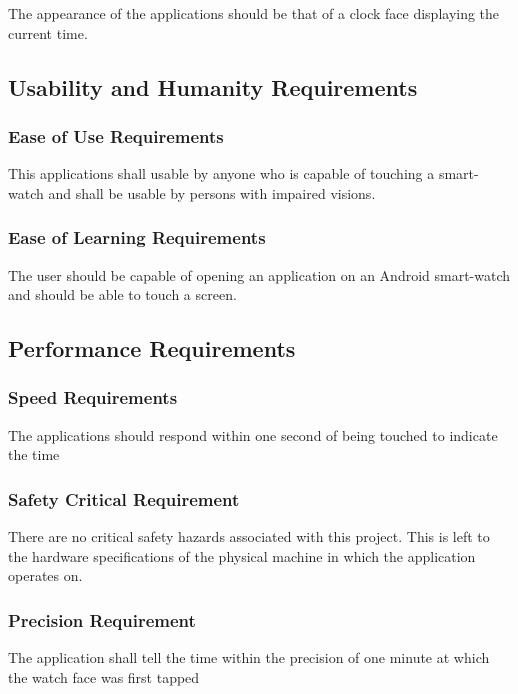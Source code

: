 \documentclass[12pt, titlepage]{article}
\begin{document}
The appearance of the applications should be that of a clock face displaying the current time.

\subsection{Usability and Humanity Requirements}

\subsubsection{Ease of Use Requirements}

This applications shall usable by anyone who is capable of touching a smart-watch and shall be usable by persons with impaired visions.


\subsubsection{Ease of Learning Requirements}

The user should be capable of opening an application on an Android smart-watch and should be able to touch a screen. 

\subsection{Performance Requirements}

\subsubsection{Speed Requirements}

The applications should respond within one second of being touched to indicate the time

\subsubsection{Safety Critical Requirement}

There are no critical safety hazards associated with this project. This is left to the hardware specifications of the physical machine in which the application operates on. 

\subsubsection{Precision Requirement}

The application shall tell the time within the precision of one minute at which the watch face was first tapped
\end{document}
